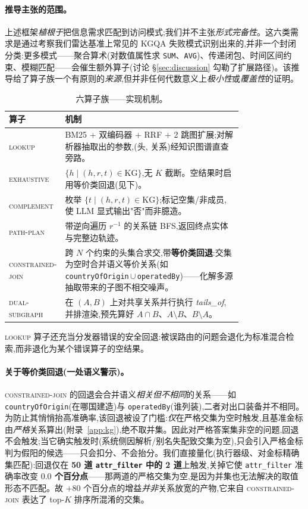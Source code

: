\documentclass[11pt,a4paper]{article}
\newcommand{\qtype}[1]{\texttt{\small #1}}
\newcommand{\op}[1]{\textsc{\small #1}}
\begin{document}
\paragraph{推导主张的范围。}
上述框架\emph{植根于}把信息需求匹配到访问模式;我们并不主张\emph{形式完备性}。这六类需求是通过考察我们雷达基准上常见的 KGQA 失败模式识别出来的,并非一个封闭分类:更多模式——聚合算术(对数值属性求 \texttt{SUM}、\texttt{AVG})、传递闭包、时间区间约束、模糊匹配——会催生额外算子(讨论 \S\ref{sec:discussion} 勾勒了扩展路径)。该推导给了算子族一个有原则的\emph{来源},但并非任何代数意义上\emph{极小性}或\emph{覆盖性}的证明。

\begin{table}[t]
\centering\small
\caption{六算子族——实现机制。}
\label{tab:operators}
\begin{tabular}{l p{0.78\linewidth}}
\toprule
\textbf{算子} & \textbf{机制} \\
\midrule
\op{lookup}            & BM25 + 双编码器 + RRF + 2 跳图扩展;对解析器抽取出的参数,(头, 关系)经知识图谱直查旁路。 \\
\op{exhaustive}        & $\{h \mid (h, r, t) \in \text{KG}\}$,无 $K$ 截断。空结果时启用等价类回退(见下)。 \\
\op{complement}        & 枚举 $\{t \mid (h, r, t) \in \text{KG}\}$;标记空集/非成员,使 LLM 显式输出"否"而非臆造。 \\
\op{path-plan}         & 带逆向遍历 $r^{-1}$ 的关系链 BFS,返回终点实体与完整边轨迹。 \\
\op{constrained-join}  & 跨 $N$ 个约束的头集合求交,带\textbf{等价类回退}:交集为空时合并语义等价关系(如 \texttt{countryOfOrigin}\,$\cup$\,\texttt{operatedBy})——化解多源抽取带来的子图不相交噪声。 \\
\op{dual-subgraph}     & 在 $(A,B)$ 上对共享关系并行执行 \textit{tails\_of},并排渲染,预先算好 $A\!\cap\!B$、$A{\setminus}B$、$B{\setminus}A$。 \\
\bottomrule
\end{tabular}
\end{table}

\op{lookup} 算子还充当分发器错误的安全回退:被误路由的问题会退化为标准混合检索,而非退化为某个错误算子的空结果。

\paragraph{关于等价类回退(一处语义警示)。}
\op{constrained-join} 的回退会合并语义\emph{相关但不相同}的关系——如 \texttt{countryOfOrigin}(在哪国建造)与 \texttt{operatedBy}(谁列装),二者对出口装备并不相同。为防止其悄悄抬高准确率,该回退被设了门槛:\emph{仅}在严格交集为空时触发,且基准金标由\emph{严格}关系算出(附录~\ref{app:kg}),绝不取并集。因此对严格答案集非空的问题,回退不会触发;当它确实触发时(系统侧因解析/别名失配致交集为空),只会引入严格金标判为假阳的候选——只会扣分、不会抬分。我们直接量化(执行器级、对金标精确集匹配):回退仅在 \textbf{50 道 \qtype{attr\_filter} 中的 2 道}上触发,关掉它使 \qtype{attr\_filter} 准确率改变 \textbf{$0.0$ 个百分点}——那两道的严格交集为空,是因为并集也无法解决的取值形态不匹配。故 $+80$ 个百分点的增益\emph{并非}关系放宽的产物,它来自 \op{constrained-join} 表达了 top-$K$ 排序所混淆的交集。
\end{document}
